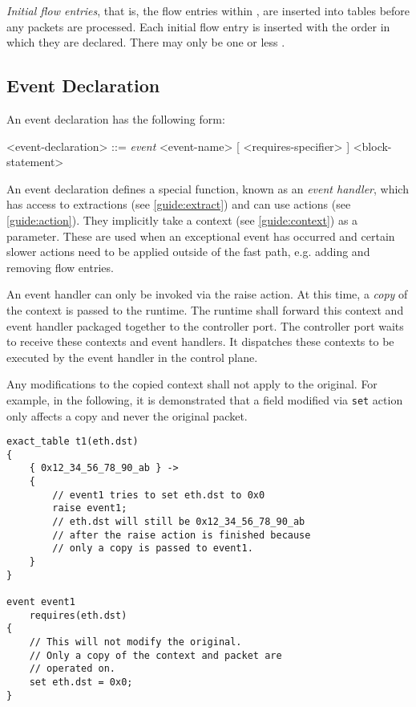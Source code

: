 \textit{Initial flow entries}, that is, the flow entries within , are inserted into tables before any packets are processed. Each initial flow entry is inserted with the order in which they are declared. There may only be one or less .

\subsection{Event Declaration} \label{guide:event}

An event declaration has the following form:

\begin{minip}
\begin{grammar}
<event-declaration> ::=
\textit{event} <event-name> [ <requires-specifier> ]
<block-statement>
\end{grammar}
\end{minip}

An event declaration defines a special function, known as an \textit{event handler}, which has access to extractions (see \ref{guide:extract}) and can use actions (see \ref{guide:action}). They implicitly take a context (see \ref{guide:context}) as a parameter. These are used when an exceptional event has occurred and certain slower actions need to be applied outside of the fast path, e.g. adding and removing flow entries.

An event handler can only be invoked via the raise action. At this time, a \textit{copy} of the context is passed to the runtime. The runtime shall forward this context and event handler packaged together to the controller port. The controller port waits to receive these contexts and event handlers. It dispatches these contexts to be executed by the event handler in the control plane.

Any modifications to the copied context shall not apply to the original. For example, in the following, it is demonstrated that a field modified via \texttt{set} action only affects a copy and never the original packet.

\begin{minip}
\begin{lstlisting}
exact_table t1(eth.dst)
{
	{ 0x12_34_56_78_90_ab } ->
	{
		// event1 tries to set eth.dst to 0x0
		raise event1;
		// eth.dst will still be 0x12_34_56_78_90_ab
		// after the raise action is finished because
		// only a copy is passed to event1.
	}
}

event event1
	requires(eth.dst)
{
	// This will not modify the original.
	// Only a copy of the context and packet are
	// operated on.
	set eth.dst = 0x0;
}
\end{lstlisting}
\end{minip}

